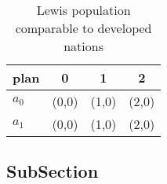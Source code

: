 \documentclass[a4paper]{article}
\begin{document}
\begin{table}
\begin{adjustbox}{width=0.6\columnwidth}
\begin{tabular}{|l|l|l|l|}
\hline
\textbf{plan} & \multicolumn{1}{c|}{\textbf{0}} & \multicolumn{1}{c|}{\textbf{1}} & \multicolumn{1}{c|}{\textbf{2}} \\ \hline
\textbf{$a_0$}  & (0,0) & (1,0) & (2,0) \\ \hline
\textbf{$a_1$}  & (0,0) & (1,0) & (2,0) \\ \hline
\end{tabular}
\end{adjustbox}
\caption{Lewis population comparable to developed nations 
}
\end{table}

\subsection{SubSection}
\end{document}
